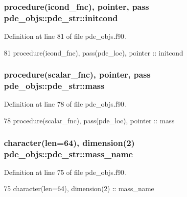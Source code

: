 \subsubsection[{initcond}]{\setlength{\rightskip}{0pt plus 5cm}procedure({\bf icond\+\_\+fnc}), pointer, pass pde\+\_\+objs\+::pde\+\_\+str\+::initcond}\label{structpde__objs_1_1pde__str_a5d20887f3eb63ece5505abd1b1fc8d01}


Definition at line 81 of file pde\+\_\+objs.\+f90.


\begin{DoxyCode}
81     \textcolor{keywordtype}{procedure}(icond_fnc), pass(pde\_loc), \textcolor{keywordtype}{pointer}     :: initcond
\end{DoxyCode}
\subsubsection[{mass}]{\setlength{\rightskip}{0pt plus 5cm}procedure({\bf scalar\+\_\+fnc}), pointer, pass pde\+\_\+objs\+::pde\+\_\+str\+::mass}\label{structpde__objs_1_1pde__str_a3dbf8e93c89f665e37d947a8c42f1336}


Definition at line 78 of file pde\+\_\+objs.\+f90.


\begin{DoxyCode}
78     \textcolor{keywordtype}{procedure}(scalar_fnc), pass(pde\_loc), \textcolor{keywordtype}{pointer}    :: mass
\end{DoxyCode}
\subsubsection[{mass\+\_\+name}]{\setlength{\rightskip}{0pt plus 5cm}character(len=64), dimension(2) pde\+\_\+objs\+::pde\+\_\+str\+::mass\+\_\+name}\label{structpde__objs_1_1pde__str_ab5b1161d04a132f823ffbe65f887ce8b}


Definition at line 75 of file pde\+\_\+objs.\+f90.


\begin{DoxyCode}
75     \textcolor{keywordtype}{character(len=64)}, \textcolor{keywordtype}{dimension(2)}                  :: mass\_name
\end{DoxyCode}
